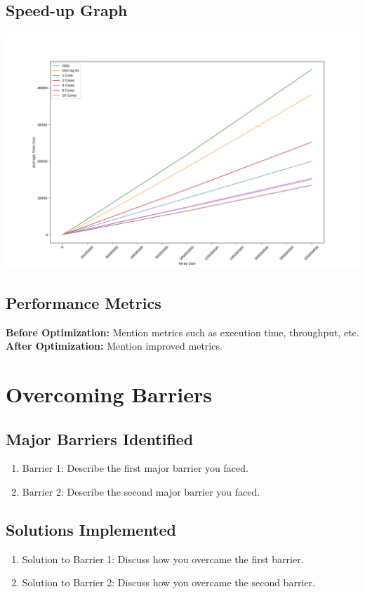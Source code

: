 \documentclass[12pt]{article}
\begin{document}
    \subsection{Speed-up Graph}
    \includegraphics[scale=0.35]{img}

    \subsection{Performance Metrics}
    \textbf{Before Optimization:} Mention metrics such as execution time, throughput, etc. \\
    \textbf{After Optimization:} Mention improved metrics.


    \section{Overcoming Barriers}

    \subsection{Major Barriers Identified}
    \begin{enumerate}
        \item Barrier 1: Describe the first major barrier you faced.
        \item Barrier 2: Describe the second major barrier you faced.
    \end{enumerate}

    \subsection{Solutions Implemented}
    \begin{enumerate}
        \item Solution to Barrier 1: Discuss how you overcame the first barrier.
        \item Solution to Barrier 2: Discuss how you overcame the second barrier.
    \end{enumerate}
\end{document}
